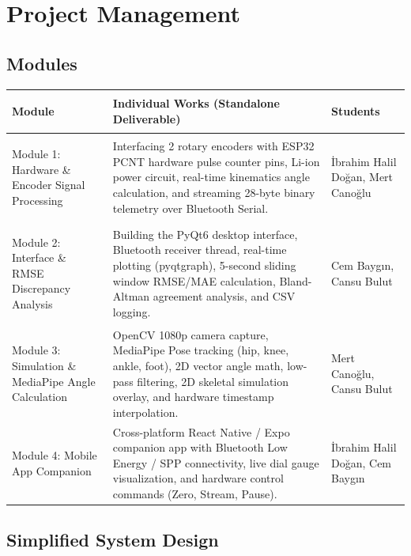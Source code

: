 \documentclass[11pt, a4paper]{article}
\begin{document}
\section{Project Management}

\subsection{Modules}

\renewcommand{\arraystretch}{1.35}
\begin{tabularx}{\textwidth}{>{\bfseries\raggedright\arraybackslash}p{3.6cm} X >{\raggedright\arraybackslash}p{3.6cm}}
\toprule
\rowcolor{lightgray} \textbf{Module} & \textbf{Individual Works (Standalone Deliverable)} & \textbf{Students} \\
\midrule
Module 1: Hardware \& Encoder Signal Processing & Interfacing 2 rotary encoders with ESP32 PCNT hardware pulse counter pins, Li-ion power circuit, real-time kinematics angle calculation, and streaming 28-byte binary telemetry over Bluetooth Serial. & İbrahim Halil Doğan, Mert Canoğlu \\
\midrule
Module 2: Interface \& RMSE Discrepancy Analysis & Building the PyQt6 desktop interface, Bluetooth receiver thread, real-time plotting (pyqtgraph), 5-second sliding window RMSE/MAE calculation, Bland-Altman agreement analysis, and CSV logging. & Cem Baygın, Cansu Bulut \\
\midrule
Module 3: Simulation \& MediaPipe Angle Calculation & OpenCV 1080p camera capture, MediaPipe Pose tracking (hip, knee, ankle, foot), 2D vector angle math, low-pass filtering, 2D skeletal simulation overlay, and hardware timestamp interpolation. & Mert Canoğlu, Cansu Bulut \\
\midrule
Module 4: Mobile App Companion & Cross-platform React Native / Expo companion app with Bluetooth Low Energy / SPP connectivity, live dial gauge visualization, and hardware control commands (Zero, Stream, Pause). & İbrahim Halil Doğan, Cem Baygın \\
\bottomrule
\end{tabularx}

\subsection{Simplified System Design}
\end{document}
